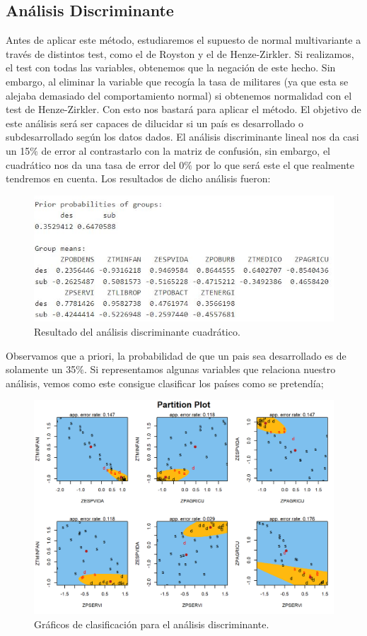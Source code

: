 \subsection{Análisis Discriminante}
Antes de aplicar este método, estudiaremos el supuesto de normal multivariante a través de distintos test, como el de Royston y el de Henze-Zirkler. Si realizamos, el test con todas las variables, obtenemos que la negación de este hecho. Sin embargo, al eliminar la variable que recogía la tasa de militares (ya que esta se alejaba demasiado del comportamiento normal) si obtenemos normalidad con el test de Henze-Zirkler. Con esto nos bastará para aplicar el método.
El objetivo de este análisis será ser capaces de dilucidar si un país es desarrollado o subdesarrollado según los datos dados.
El análisis discriminante lineal nos da casi un 15$\%$ de error al contrastarlo con la matriz de confusión, sin embargo, el cuadrático nos da una tasa de error del 0$\%$ por lo que será este el que realmente tendremos en cuenta. Los resultados de dicho análisis fueron:

\begin{figure}[H]
    \centering
    \includegraphics[scale=0.8]{ADC.JPG}
    \caption{Resultado del análisis discriminante cuadrático.}
\end{figure}
Observamos que a priori, la probabilidad de que un pais sea desarrollado es de solamente un 35$\%$. Si representamos algunas variables que relaciona nuestro análisis, vemos como este consigue clasificar los países como se pretendía;
\begin{figure}[H]
    \centering
    \includegraphics[scale=0.8]{adimage.png}
    \caption{Gráficos de clasificación para el análisis discriminante.}
\end{figure}

